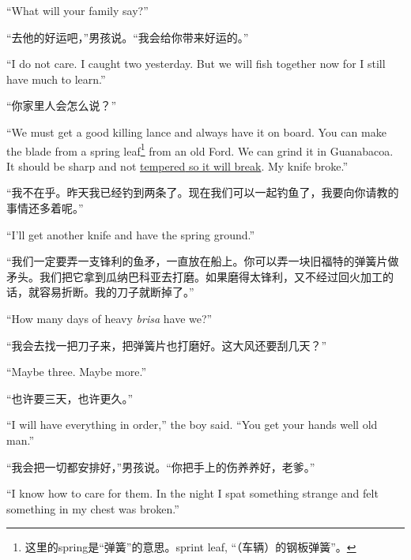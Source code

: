 \begin{paracol}{2}
``What will your family say?''

\switchcolumn

“去他的好运吧，”男孩说。“我会给你带来好运的。”

\switchcolumn*

``I do not care. I caught two yesterday. But we will fish together now for I
still have much to learn.''

\switchcolumn

“你家里人会怎么说？”

\switchcolumn*

``We must get a good killing \gls{lance} and always have it on board. You can make
the blade from a spring leaf\footnote{这里的spring是“弹簧”的意思。sprint
  leaf, “（车辆）的钢板弹簧”。} from an old Ford. We can \gls{grind} it
in Guanabacoa. It should be sharp and not \uline{\gls{tempered} so it will break}.
My knife broke.''

\switchcolumn

“我不在乎。昨天我已经钓到两条了。现在我们可以一起钓鱼了，我要向你请教的事情还多着呢。”

\switchcolumn*

``I'll get another knife and have the spring ground.''

\switchcolumn

“我们一定要弄一支锋利的鱼矛，一直放在船上。你可以弄一块旧福特的弹簧片做矛头。我们把它拿到瓜纳巴科亚去打磨。如果磨得太锋利，又不经过回火加工的话，就容易折断。我的刀子就断掉了。”

\switchcolumn*

``How many days of heavy \emph{brisa} have we?''

\switchcolumn

“我会去找一把刀子来，把弹簧片也打磨好。这大风还要刮几天？”

\switchcolumn*

``Maybe three. Maybe more.''

\switchcolumn

“也许要三天，也许更久。”

\switchcolumn*

``I will have everything in order,'' the boy said. ``You get your hands well
old man.''

\switchcolumn

“我会把一切都安排好，”男孩说。“你把手上的伤养养好，老爹。”

\switchcolumn*

``I know how to care for them. In the night I spat something strange and
felt something in my chest was broken.''


\end{paracol}
